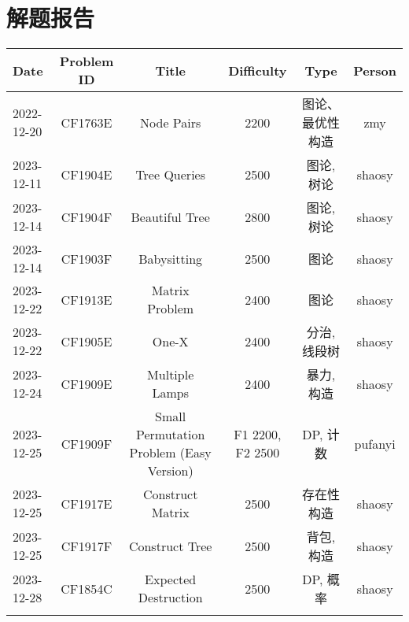 \chapter{解题报告}
\begin{center}
\begin{longtable}{l c c c c c }

Date & Problem ID & Title & Difficulty & Type & Person   \\ 
\hline
2022-12-20 & CF1763E & Node Pairs & 2200 & 图论、最优性构造 & zmy  \\
2023-12-11 & CF1904E & Tree Queries & 2500 & 图论, 树论 & shaosy \\
2023-12-14 & CF1904F & Beautiful Tree & 2800 & 图论, 树论 & shaosy \\
2023-12-14 & CF1903F & Babysitting & 2500 & 图论 & shaosy \\
2023-12-22 & CF1913E & Matrix Problem & 2400 & 图论 & shaosy \\
2023-12-22 & CF1905E & One-X & 2400 & 分治, 线段树 & shaosy \\
2023-12-24 & CF1909E & Multiple Lamps & 2400 & 暴力, 构造 & shaosy \\
2023-12-25 & CF1909F & Small Permutation Problem (Easy Version) & F1 2200, F2 2500 & DP, 计数 & pufanyi \\
2023-12-25 & CF1917E & Construct Matrix & 2500 & 存在性构造 & shaosy \\
2023-12-25 & CF1917F & Construct Tree & 2500 & 背包, 构造 & shaosy \\
2023-12-28 & CF1854C & Expected Destruction & 2500 & DP, 概率 & shaosy \\
\hline

\label{tab:practice_index}
\end{longtable}
\end{center}



